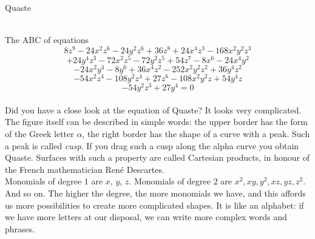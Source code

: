 \documentclass[es]{./../../common/SurferDesc}%
\begin{document}
\footnotesize





\begin{surferPage}
  \begin{surferTitle}Quaste\end{surferTitle} \\
The ABC of equations
  \smallskip
\[8z^9-24x^2z^6-24y^2z^6+36z^8+24x^4z^3-168x^2y^2z^3\]
\[+24y^4z^3-72x^2z^5-72y^2z^5+54z^7-8x^6-24x^4y^2\]
\[-24x^2y^4-8y^6 + 36x^4z^2-252x^2y^2z^2+36y^4z^2\]
\[- 54x^2z^4-108y^2z^4 + 27z^6-108x^2y^2z + 54y^4z\]
\[-54y^2z^3 + 27y^4 = 0\]\\
\vspace{0.3cm}
Did you have a close look at the equation of Quaste? It  looks very complicated.
The figure itself can be described in simple words: the upper border has the form of the Greek letter $\alpha$, the right border has the shape of a curve with a peak. Such a peak is called {\it cusp}. If you drag such a cusp along the alpha curve you obtain Quaste. Surfaces with such a property are called Cartesian products, in honour of the French mathematician  Ren\'e Descartes.\\
\vspace{0.3cm}
Monomials of degree $1$ are $x$, $y$, $z$. Monomials of degree $2$ are $x^2, xy, y^2, xz, yz, z^2$. And so on. The higher the degree, the more monomials we have, and this affords us more possibilities to create more complicated shapes. It is like an alphabet: if we have more letters at our disposal, we can write more complex words and phrases. 




  \begin{surferText}
     \end{surferText}
\end{surferPage}
\end{document}
